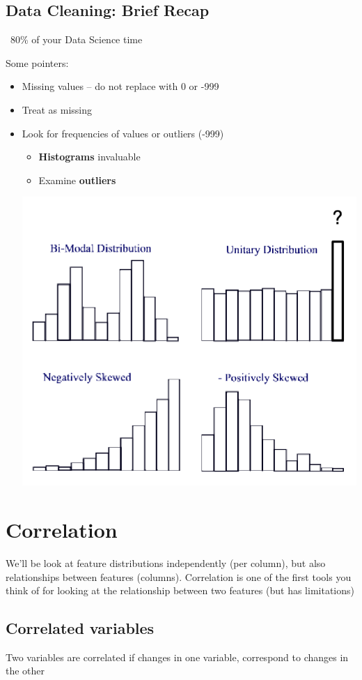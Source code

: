 \documentclass[11pt]{article}
\theoremstyle{definition}
\begin{document}
\subsection{Data Cleaning: Brief Recap}
~80\% of your Data Science time

Some pointers:
\begin{itemize}
  \item Missing values – do not
  replace with 0 or -999
  \item Treat as missing
  \item Look for frequencies of
  values or outliers (-999)
  \begin{itemize}
    \item \textbf{Histograms} invaluable
    \item Examine \textbf{outliers} 
  \end{itemize}
  \includegraphics[width=\textwidth-27.37506pt]{2.png}
\end{itemize}
\section{Correlation}
We’ll be look at feature distributions
independently (per column), but also
relationships between features (columns).
Correlation is one of the first tools you think of
for looking at the relationship between two
features (but has limitations)
\subsection{Correlated variables}
Two variables are correlated if changes in one
variable, correspond to changes in the other
\end{document}
